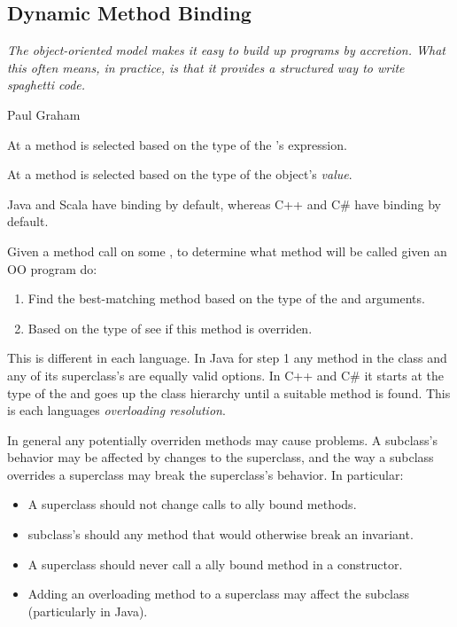 \documentclass{article}
\begin{document}
\subsection{Dynamic Method Binding}

\epigraph{\itshape The object-oriented model makes it easy to build up programs by accretion. What this often means, in practice, is that it provides a structured way to write spaghetti code.}{Paul Graham}

\begin{definition}
At \compiletime{} a method is selected based on the \textit{\static{}} type of the \receiver{}'s \textit{\syntactic{}} expression.
\end{definition}

\begin{definition}
At \runtime{} a method is selected based on the \textit{\dynamic{}} type of the \receiver{} object's \textit{value}.
\end{definition}

Java and Scala have \dynamic{} binding by default, whereas C++ and C\# have \static{} binding by default.

\begin{definition}
\label{twostep}
Given a method call on some \receiver{},
 to determine what method will be called given an OO program do:
\begin{enumerate}
\item Find the best-matching method based on the \textit{\static{}} type of the \receiver{} and arguments.
\item Based on the \textit{\dynamic{}} type of \receiver{} see if this method is overriden.
\end{enumerate}
This is different in each language. In Java for step 1 any method in the \static{} class and any of its superclass's are equally valid options. In C++ and C\# it starts at the \static{} type of the \receiver{} and goes up the class hierarchy until a suitable method is found.
This is each languages \textit{overloading resolution}.
\end{definition}

\begin{definition}
\label{fragile}
In general any potentially overriden methods may cause problems. A subclass's behavior may be affected by changes to the superclass, and the way a subclass overrides a superclass may break the superclass's behavior. In particular:
\begin{itemize}
\item A superclass should not change calls to \dynamic{}ally bound methods.
\item subclass's should \override{} any method that would otherwise break an invariant.
\item A superclass should never call a \dynamic{}ally bound method in a constructor.
\item Adding an overloading method to a superclass may affect the subclass (particularly in Java).
\end{itemize}
\end{definition}
\end{document}
